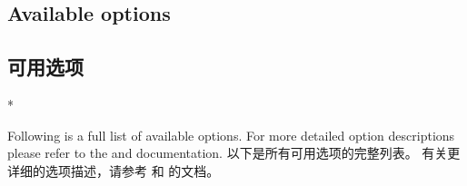 % 
%  

\begin{paracol}{2}


\subsection{Available options}
\switchcolumn
\subsection{可用选项}
\switchcolumn[0]*%
\newcommand\appliesto[1]{\textsf{[For #1 only]}}
\newcommand\appliestoCn[1]{\textsf{[仅适用于 #1]}}

Following is a full list of available options.
For more detailed option descriptions please refer to the  and  documentation.
\switchcolumn
以下是所有可用选项的完整列表。
有关更详细的选项描述，请参考  和  的文档。


\end{paracol}
